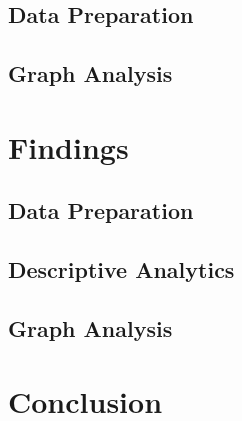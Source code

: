 \documentclass[conference]{IEEEtran}
\begin{document}
\subsection{Data Preparation}
\label{methods-data-preparation}


\subsection{Graph Analysis}
\label{methods-graph-analysis}


\section{Findings}
\label{findings}
\subsection{Data Preparation}
\label{findings-data-preparation}


\subsection{Descriptive Analytics}
\label{findings-descriptive}


\subsection{Graph Analysis}
\label{findings-graph-analysis}


\section{Conclusion}
\label{conclusion}


\newpage
\newpage


\end{document}
